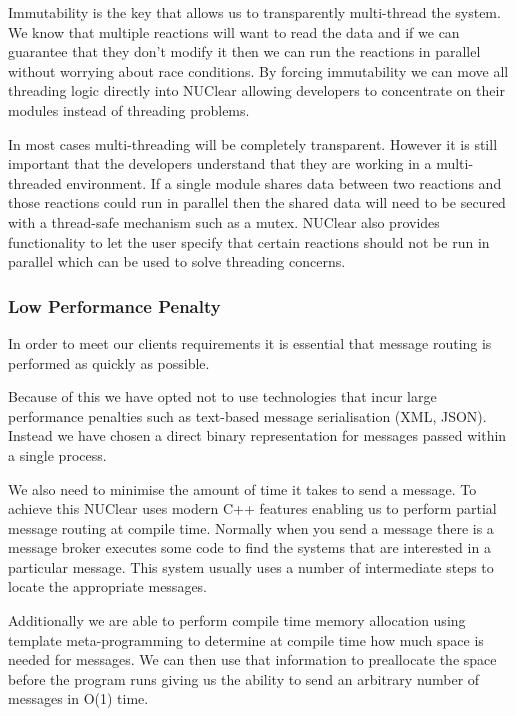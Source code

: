 \documentclass[english,12pt]{scrartcl}
\begin{document}
				Immutability is the key that allows us to transparently multi-thread the system.
				We know that multiple reactions will want to read the data and if we can guarantee that they don't modify it then we can
				run the reactions in parallel without worrying about race conditions.
				By forcing immutability we can move all threading logic directly into NUClear allowing developers to concentrate on their modules instead of threading problems.
				
				In most cases multi-threading will be completely transparent. 
				However it is still important that the developers understand that they are working in a multi-threaded environment.
				If a single module shares data between two reactions and those reactions could run in parallel then the shared data will
				need to be secured with a thread-safe mechanism such as a mutex.
				NUClear also provides functionality to let the user specify that certain reactions should not be run in parallel which can be used to solve threading concerns.
			
			\subsubsection{Low Performance Penalty}
				In order to meet our clients requirements it is essential that message routing is performed as quickly as possible. 
			
				Because of this we have opted not to use technologies that incur large performance penalties such as text-based message serialisation (XML, JSON).
				Instead we have chosen a direct binary representation for messages passed within a single process. 
				
				We also need to minimise the amount of time it takes to send a message. 
				To achieve this NUClear uses modern C++ features enabling us to perform partial message routing at compile time.
				Normally when you send a message there is a message broker executes some code to find the systems that are interested in a particular message.
				This system usually uses a number of intermediate steps to locate the appropriate messages.
				
				Additionally we are able to perform compile time memory allocation using template meta-programming to determine at compile time how much space is needed for messages.
				We can then use that information to preallocate the space before the program runs giving us the ability to send an arbitrary number of messages in O(1) time.
			
\end{document}
